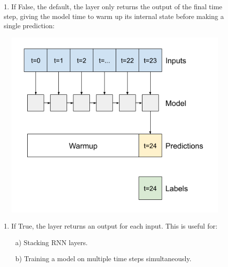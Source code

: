 \begin{itemize}
  \item[1.] If False, the default, the layer only returns the output of the final time step, giving the model time to warm up its internal state before making a single prediction:
\end{itemize}


\begin{figure}[H]
\centering
  \includegraphics[scale=0.35]{img/task_1/fig1.png}
  \label{fig: }
\end{figure}


\begin{itemize}
  \item[1.] If True, the layer returns an output for each input. This is useful for:
  \begin{itemize}
     \item[a)] Stacking RNN layers.
     \item[b)] Training a model on multiple time steps simultaneously.
   \end{itemize}
\end{itemize}


